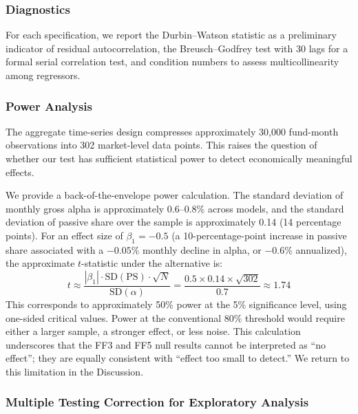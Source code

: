 \documentclass[11pt, a4paper]{article}
\begin{document}
\subsubsection{Diagnostics}

For each specification, we report the Durbin--Watson statistic \parencite{durbin1951} as a preliminary indicator of residual autocorrelation, the Breusch--Godfrey test \parencite{breusch1978, godfrey1978} with 30 lags for a formal serial correlation test, and condition numbers to assess multicollinearity among regressors.

\subsubsection{Power Analysis}
\label{subsec:power}

The aggregate time-series design compresses approximately 30,000 fund-month observations into 302 market-level data points. This raises the question of whether our test has sufficient statistical power to detect economically meaningful effects.

We provide a back-of-the-envelope power calculation. The standard deviation of monthly gross alpha is approximately 0.6--0.8\% across models, and the standard deviation of passive share over the sample is approximately 0.14 (14 percentage points). For an effect size of $\beta_1 = -0.5$ (a 10-percentage-point increase in passive share associated with a $-0.05$\% monthly decline in alpha, or $-0.6$\% annualized), the approximate $t$-statistic under the alternative is:
\begin{equation}
    t \approx \frac{|\beta_1| \cdot \text{SD}(\text{PS}) \cdot \sqrt{N}}{\text{SD}(\alpha)} = \frac{0.5 \times 0.14 \times \sqrt{302}}{0.7} \approx 1.74
    \label{eq:power}
\end{equation}
This corresponds to approximately 50\% power at the 5\% significance level, using one-sided critical values. Power at the conventional 80\% threshold would require either a larger sample, a stronger effect, or less noise. This calculation underscores that the FF3 and FF5 null results cannot be interpreted as ``no effect''; they are equally consistent with ``effect too small to detect.'' We return to this limitation in the Discussion.

\subsubsection{Multiple Testing Correction for Exploratory Analysis}
\label{subsub:multiple_testing}
\end{document}
